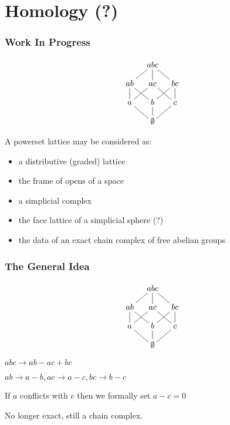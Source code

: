 \documentclass{beamer}
\begin{document}
\section{Homology (?)}
\begin{frame}
\frametitle{Work In Progress}

\begin{figure}
\begin{equation*}
    \xymatrix@=1em{& abc \ar@{-}[dl] \ar@{-}[d] \ar@{-}[dr] & \\
      ab \ar@{-}[d] \ar@{-}[dr] & ac \ar@{-}[dl] \ar@{-}[dr] &
        bc \ar@{-}[d] \ar@{-}[dl] \\
      a \ar@{-}[dr] & b \ar@{-}[d] & c \ar@{-}[dl] \\
       & \emptyset &}
\end{equation*}
\end{figure}

A powerset lattice may be considered as:
\begin{itemize}
\item a distributive (graded) lattice
\item the frame of opens of a space
\item a simplicial complex
\item the face lattice of a simplicial sphere (?)
\item the data of an exact chain complex of free abelian groups
\end{itemize} 
\end{frame}

\begin{frame}
\frametitle{The General Idea}

\begin{figure}
\begin{equation*}
    \xymatrix@=1em{& abc \ar@{-}[dl] \ar@{-}[d] \ar@{-}[dr] & \\
      ab \ar@{-}[d] \ar@{-}[dr] & ac \ar@{-}[dl] \ar@{-}[dr] &
        bc \ar@{-}[d] \ar@{-}[dl] \\
      a \ar@{-}[dr] & b \ar@{-}[d] & c \ar@{-}[dl] \\
       & \emptyset &}
\end{equation*}
\end{figure}

\(abc \to ab - ac + bc\)

\(ab \to a - b, ac \to a - c, bc \to b - c\)

If \(a\) conflicts with \(c\) then we formally set \(a - c = 0\)

No longer exact, still a chain complex.

\end{frame}
\end{document}

